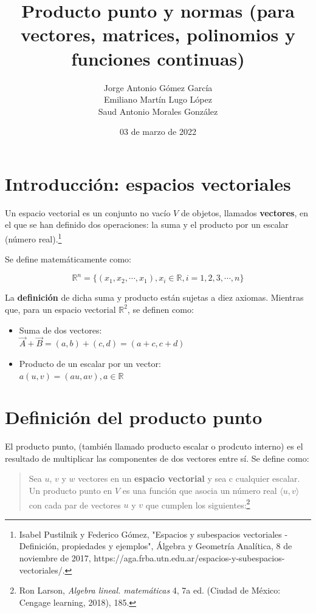 \documentclass{article}
\title{Producto punto y normas (para vectores, matrices, polinomios y funciones continuas)}
\author{
    Jorge Antonio Gómez García \\
    Emiliano Martín Lugo López \\
    Saud Antonio Morales González}
\date{03 de marzo de 2022}
\begin{document}
\maketitle

\section{Introducción: espacios vectoriales}

    Un espacio vectorial es un conjunto no vacío $V$ de objetos, llamados \textbf{vectores}, en el que se han definido dos operaciones: la suma y el producto por un escalar (número real).\footnote{Isabel Pustilnik y Federico Gómez, "Espacios y subespacios vectoriales - Definición, propiedades y ejemplos", Álgebra y Geometría Analítica, 8 de noviembre de 2017, https://aga.frba.utn.edu.ar/espacios-y-subespacios-vectoriales/.}

    Se define matemáticamente como:

    \begin{equation*}
        \mathbb{R}^n=\{ (x_1, x_2, \dotsb, x_1), x_i \in \mathbb{R}, i=1,2,3,\dotsb,n \}
    \end{equation*}

    La \textbf{definición} de dicha suma y producto están sujetas a diez axiomas. Mientras que, para un espacio vectorial $\mathbb{R}^2$, se definen como:
    \begin{itemize}
        \item Suma de dos vectores: \\
            $ {\vec{A} + \vec{B}= (a,b) + (c,d) = (a+c, c+d)} $
                
        \item Producto de un escalar por un vector: \\
            $ {a(u, v) = (au, av), a \in \mathbb{R}} $
                
    \end{itemize}

\section{Definición del producto punto}

    El producto punto, (también llamado producto escalar o prodcuto interno) es el resultado de multiplicar las componentes de dos vectores entre sí. Se define como:

    \begin{quote}
        Sea $u$, $v$ y $w$ vectores en un \textbf{espacio vectorial} y sea c cualquier escalar. Un producto punto en $V$ es una función que asocia un número real $\langle u, v\rangle$ con cada par de vectores $u$ y $v$ que cumplen los siguientes:\footnote{Ron Larson, \textit{Algebra lineal. matemáticas} 4, 7a ed. (Ciudad de México: Cengage learning, 2018), 185.}
    \end{quote}
\end{document}
